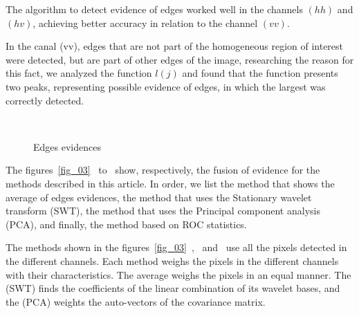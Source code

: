 \documentclass[conference]{IEEEtran}
\begin{document}
The algorithm to detect evidence of edges worked well in the channels $(hh)$ and $(hv)$, achieving better accuracy in relation to the channel $(vv)$.  

In the canal (vv), edges that are not part of the homogeneous region of interest were detected, but are part of other edges of the image, researching the reason for this fact, we analyzed the function $l(j)$ and found that the function presents two peaks, representing possible evidence of edges, in which the largest was correctly detected. 
   \begin{figure}[!ht]
     \hfill
     \\
     \centering
     \caption{Edges evidences}
     \label{fig_02}
   \end{figure}

The figures~\ref{fig_03}~ to~ show, respectively, the fusion of evidence for the methods described in this article. In order, we list the method that shows the average of edges evidences, the method that uses the Stationary wavelet transform (SWT), the method that uses the Principal component analysis (PCA), and finally, the method based on ROC statistics.

The methods shown in the figures~\ref{fig_03}~,~ and~ use all the pixels detected in the different channels. Each method weighs the pixels in the different channels with their characteristics. The average weighs the pixels in an equal manner. The (SWT) finds the coefficients of the linear combination of its wavelet bases, and the (PCA) weights the auto-vectors of the covariance matrix.
\end{document}
